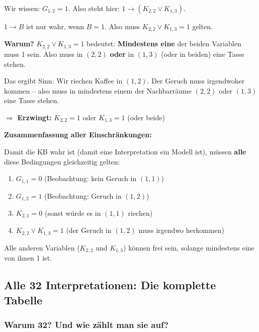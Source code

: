 \documentclass[a4paper,12pt]{article}
\begin{document}
Wir wissen: $G_{1,2} = 1$. Also steht hier: $1 \to (K_{2,2} \vee K_{1,3})$.

$1 \to B$ ist nur wahr, wenn $B = 1$. Also muss $K_{2,2} \vee K_{1,3} = 1$ gelten.

\textbf{Warum?} $K_{2,2} \vee K_{1,3} = 1$ bedeutet: \textbf{Mindestens eine} der beiden Variablen muss 1 sein. Also muss in $(2{,}2)$ \textbf{oder} in $(1{,}3)$ (oder in beiden) eine Tasse stehen.

Das ergibt Sinn: Wir riechen Kaffee in $(1{,}2)$. Der Geruch muss irgendwoher kommen -- also muss in mindestens einem der Nachbarr\"aume $(2{,}2)$ oder $(1{,}3)$ eine Tasse stehen.

$\Rightarrow$ \textbf{Erzwingt:} $K_{2,2} = 1$ oder $K_{1,3} = 1$ (oder beide)

\bigskip
\textbf{Zusammenfassung aller Einschr\"ankungen:}

\begin{merkbox}
Damit die KB wahr ist (damit eine Interpretation ein Modell ist), m\"ussen \textbf{alle} diese Bedingungen gleichzeitig gelten:
\begin{enumerate}
\item $G_{1,1} = 0$ \quad (Beobachtung: kein Geruch in $(1{,}1)$)
\item $G_{1,2} = 1$ \quad (Beobachtung: Geruch in $(1{,}2)$)
\item $K_{2,1} = 0$ \quad (sonst w\"urde es in $(1{,}1)$ riechen)
\item $K_{2,2} \vee K_{1,3} = 1$ \quad (der Geruch in $(1{,}2)$ muss irgendwo herkommen)
\end{enumerate}
Alle anderen Variablen ($K_{2,2}$ und $K_{1,3}$) k\"onnen frei sein, solange mindestens eine von ihnen 1 ist.
\end{merkbox}


\subsection{Alle 32 Interpretationen: Die komplette Tabelle}

\subsubsection*{Warum 32? Und wie z\"ahlt man sie auf?}
\end{document}

